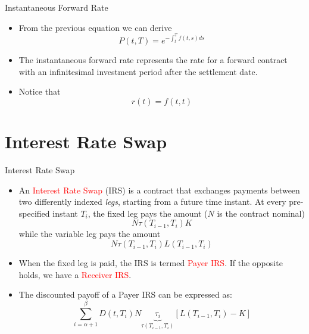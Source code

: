 \documentclass{beamer}
\begin{document}
\begin{frame}{Instantaneous Forward Rate}
	\begin{itemize}
		\item From the previous equation we can derive
		\begin{equation}
			P(t, T) = e^{-\int_t^T f(t, s) ds}
		\end{equation}
		\item The instantaneous forward rate represents the rate for a forward contract with an infinitesimal investment period after the settlement date.
		\item Notice that
		\begin{equation*}
			r(t) = f(t,t)
		\end{equation*}
	\end{itemize}
\end{frame}

\section{Interest Rate Swap}
\begin{frame}{Interest Rate Swap}
	\begin{itemize}
		\item An \textcolor{red}{Interest Rate Swap} (IRS) is a contract that exchanges payments between two differently indexed \emph{legs}, starting from a future time instant. At every pre-specified instant $T_i$, the fixed leg pays the amount ($N$ is the contract nominal)
		\begin{equation*}
			N\tau(T_{i-1}, T_i)K
		\end{equation*}
		while the variable leg pays the amount
		\begin{equation*}
			N\tau(T_{i-1}, T_i)L(T_{i-1}, T_i)
		\end{equation*}
		\item<2-> When the fixed leg is paid, the IRS is termed \textcolor{red}{Payer IRS}. If the opposite holds, we have a \textcolor{red}{Receiver IRS}.
		\item<3-> The discounted payoff of a Payer IRS can be expressed as:
		\begin{equation}
			\sum_{i=\alpha+1}^{\beta} D(t,T_i)N \underbrace{\tau_i}_{\tau(T_{i-1},T_i)}
			\left[L(T_{i-1},T_i)-K\right]
			\label{eq:payoff_payer_irs}
		\end{equation}	
	\end{itemize}
\end{frame}
\end{document}
